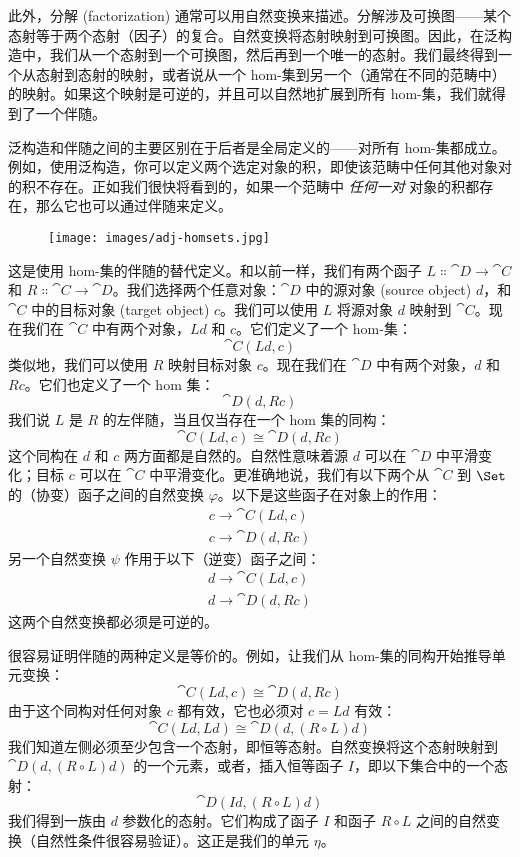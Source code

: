 此外，分解 (factorization) 通常可以用自然变换来描述。分解涉及可换图——某个态射等于两个态射（因子）的复合。自然变换将态射映射到可换图。因此，在泛构造中，我们从一个态射到一个可换图，然后再到一个唯一的态射。我们最终得到一个从态射到态射的映射，或者说从一个 hom-集到另一个（通常在不同的范畴中）的映射。如果这个映射是可逆的，并且可以自然地扩展到所有 hom-集，我们就得到了一个伴随。

泛构造和伴随之间的主要区别在于后者是全局定义的——对所有 hom-集都成立。例如，使用泛构造，你可以定义两个选定对象的积，即使该范畴中任何其他对象对的积不存在。正如我们很快将看到的，如果一个范畴中 \emph{任何一对} 对象的积都存在，那么它也可以通过伴随来定义。

\begin{figure}[H]
  \centering
  \texttt{[image: images/adj-homsets.jpg]}
\end{figure}

\noindent
这是使用 hom-集的伴随的替代定义。和以前一样，我们有两个函子 $L \Colon \cat{D} \to \cat{C}$ 和 $R \Colon \cat{C} \to \cat{D}$。我们选择两个任意对象：$\cat{D}$ 中的源对象 (source object) $d$，和 $\cat{C}$ 中的目标对象 (target object) $c$。我们可以使用 $L$ 将源对象 $d$ 映射到 $\cat{C}$。现在我们在 $\cat{C}$ 中有两个对象，$L d$ 和 $c$。它们定义了一个 hom-集：
\[\cat{C}(L d, c)\]
类似地，我们可以使用 $R$ 映射目标对象 $c$。现在我们在 $\cat{D}$ 中有两个对象，$d$ 和 $R c$。它们也定义了一个 hom 集：
\[\cat{D}(d, R c)\]
我们说 $L$ 是 $R$ 的左伴随，当且仅当存在一个 hom 集的同构：
\[\cat{C}(L d, c) \cong \cat{D}(d, R c)\]
这个同构在 $d$ 和 $c$ 两方面都是自然的。自然性意味着源 $d$ 可以在 $\cat{D}$ 中平滑变化；目标 $c$ 可以在 $\cat{C}$ 中平滑变化。更准确地说，我们有以下两个从 $\cat{C}$ 到 $\Set$ 的（协变）函子之间的自然变换 $\varphi$。以下是这些函子在对象上的作用：
\begin{gather*}
  c \to \cat{C}(L d, c) \\
  c \to \cat{D}(d, R c)
\end{gather*}
另一个自然变换 $\psi$ 作用于以下（逆变）函子之间：
\begin{gather*}
  d \to \cat{C}(L d, c) \\
  d \to \cat{D}(d, R c)
\end{gather*}
这两个自然变换都必须是可逆的。

很容易证明伴随的两种定义是等价的。例如，让我们从 hom-集的同构开始推导单元变换：
\[\cat{C}(L d, c) \cong \cat{D}(d, R c)\]
由于这个同构对任何对象 $c$ 都有效，它也必须对 $c = L d$ 有效：
\[\cat{C}(L d, L d) \cong \cat{D}(d, (R \circ L) d)\]
我们知道左侧必须至少包含一个态射，即恒等态射。自然变换将这个态射映射到 $\cat{D}(d, (R \circ L) d)$ 的一个元素，或者，插入恒等函子 $I$，即以下集合中的一个态射：
\[\cat{D}(I d, (R \circ L) d)\]
我们得到一族由 $d$ 参数化的态射。它们构成了函子 $I$ 和函子 $R \circ L$ 之间的自然变换（自然性条件很容易验证）。这正是我们的单元 $\eta$。

